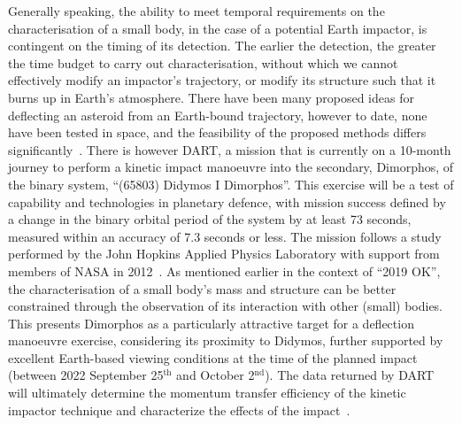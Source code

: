 Generally speaking, the ability to meet temporal requirements on the characterisation of a small body, in the case of a potential Earth impactor, is contingent on the timing of its detection. The earlier the detection, the greater the time budget to carry out characterisation, without which we cannot effectively modify an impactor's trajectory, or modify its structure such that it burns up in Earth's atmosphere. There have been many proposed ideas for deflecting an asteroid from an Earth-bound trajectory, however to date, none have been tested in space, and the feasibility of the proposed methods differs significantly~\cite{Harris2015}. There is however  \gls{DART}, a mission that is currently on a 10-month journey to perform a kinetic impact manoeuvre into the secondary, Dimorphos, of the binary system, ``(65803) Didymos I Dimorphos''. This exercise will be a test of  capability and technologies in planetary defence, with mission success defined by a change in the binary orbital period of the system by at least 73 seconds, measured within an accuracy of 7.3 seconds or less. The mission follows a study performed by the John Hopkins Applied Physics Laboratory with support from members of \gls{NASA} in 2012~\cite{Cheng2012}. As mentioned earlier in the context of ``2019 OK'', the characterisation of a small body's mass and structure can be better constrained through the observation of its interaction with other (small) bodies. This presents Dimorphos as a particularly attractive target for a deflection manoeuvre exercise, considering its proximity to Didymos, further supported by excellent Earth-based viewing conditions at the time of the planned impact (between 2022 September 25$^{\text{th}}$ and October 2$^{\text{nd}}$). The data returned by \gls{DART} will ultimately determine the momentum transfer efficiency of the kinetic impactor technique and characterize the effects of the impact~\cite{Cheng2012, Rivkin2021}.


